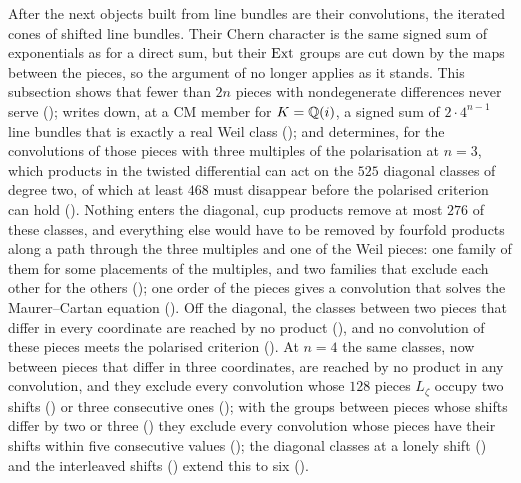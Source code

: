 After  the next objects built from line bundles are their
convolutions, the iterated cones of shifted line bundles. Their Chern
character is the same signed sum of exponentials as for a direct sum, but
their $\operatorname{Ext}$ groups are cut down by the maps between the pieces, so the
argument of \cite[Theorem~9.20]{paperI} no longer applies as it stands. This
subsection shows that fewer than $2n$ pieces with nondegenerate differences
never serve (); writes down, at a CM member for
$K=\mathbb{Q}(i)$, a signed sum of $2\cdot4^{n-1}$ line bundles that is exactly a
real Weil class (); and determines, for the
convolutions of those pieces with three multiples of the polarisation at
$n=3$, which products in the twisted differential can act on the $525$
diagonal classes of degree two, of which at least $468$ must disappear
before the polarised criterion can hold (). Nothing
enters the diagonal, cup products remove at most $276$ of these classes, and
everything else would have to be removed by fourfold products along a path
through the three multiples and one of the Weil pieces: one family of them
for some placements of the multiples, and two families that exclude each
other for the others (); one order of the pieces
gives a convolution that solves the Maurer--Cartan equation
(). Off the diagonal, the classes between two
pieces that differ in every coordinate are reached by no product
(), and no
convolution of these pieces meets the polarised criterion
(). At $n=4$ the same classes, now between pieces
that differ in three coordinates, are reached by no product in any
convolution, and they exclude every convolution whose $128$ pieces
$L_{\zeta}$ occupy two shifts () or three
consecutive ones (); with the groups between
pieces whose shifts differ by two or three () they
exclude every convolution whose pieces have their shifts within five
consecutive values (); the diagonal classes at a lonely
shift () and the interleaved shifts
() extend this to six ().

